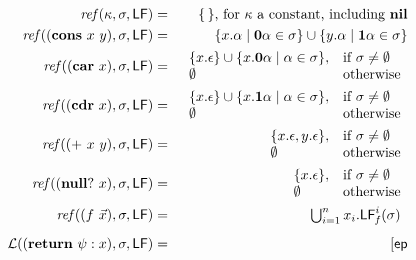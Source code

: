 \documentclass[9pt]{sigplanconf}
\def\myvec{\mathaccent"017E }
\begin{document}
\begin{figure*}[t]
\begin{eqnarray*}
\mathit{ref\/}(\kappa,\sigma,\Lfonly)
          &=& \{\,\} \mbox{, for $\kappa$ a constant, including
$\NIL$}\\
\mathit{ref\/}((\CONS~x~y),\sigma,\Lfonly)
          &=& \{x.\alpha \mid \acar\alpha \in \sigma\} \cup \{y.\alpha
\mid \acdr\alpha \in \sigma\} \\
\mathit{ref\/}((\CAR~x),\sigma,\Lfonly)
          &=&    \begin{array}{l l}
                    \{x.\epsilon\} \cup \{x.\acar\alpha \mid \alpha \in
\sigma\}, & \mbox{if}~\sigma \ne \emptyset\\
                    \emptyset  & \mbox{otherwise}
                 \end{array} \\
\mathit{ref\/}((\CDR~x),\sigma,\Lfonly)
          &=&    \begin{array}{l l}
                    \{x.\epsilon\} \cup \{x.\acdr\alpha \mid \alpha \in
\sigma\}, & \mbox{if}~\sigma \ne \emptyset\\
                    \emptyset  & \mbox{otherwise}
                 \end{array} \\
\mathit{ref\/}((\PRIM~x~y),\sigma,\Lfonly)
          &=&    \begin{array}{l l}
                    \{x.\epsilon, y.\epsilon\},  & \mbox{if}~\sigma \ne
\emptyset\\
                    \emptyset  & \mbox{otherwise}
                 \end{array} \\
\mathit{ref\/}((\NULLQ~x),\sigma,\Lfonly)
          &=&    \begin{array}{l l}
                    \{x.\epsilon\},  & \mbox{if}~\sigma \ne \emptyset\\
                    \emptyset  & \mbox{otherwise}
                 \end{array} \\
\mathit{ref\/}((f~\myvec{x}),\sigma,\Lfonly)
          &=&  \begin{array}{@{}l}  %
               \bigcup_{i=1}^n x_i.\Lf{f}{i}{\sigma}
               \end{array}
\\[1ex]
\mathcal{L}((\SRETURN~\psi:x),\sigma,\Lfonly) &=& \lbrack \mathit{\epath}

\end{eqnarray*}
\end{figure*}
\end{document}
